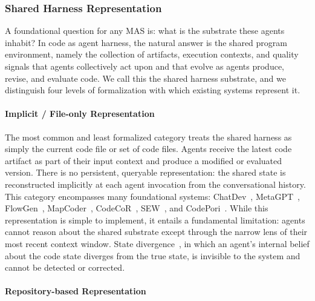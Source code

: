 \subsubsection{Shared Harness Representation}

A foundational question for any MAS is: what is the substrate
these agents inhabit? In code as agent harness, the natural
answer is the shared program environment, namely the collection
of artifacts, execution contexts, and quality signals that agents
collectively act upon and that evolve as agents produce, revise,
and evaluate code. We call this the shared harness substrate, and
we distinguish four levels of formalization with which existing
systems represent it.

\paragraph{Implicit / File-only Representation}

The most common and least formalized category treats the shared
harness as simply the current code file or set of code files.
Agents receive the latest code artifact as part of their input
context and produce a modified or evaluated version. There is no
persistent, queryable representation: the shared state is
reconstructed implicitly at each agent invocation from the
conversational history. This category encompasses many
foundational systems: ChatDev~\cite{Qian2023ChatDev},
MetaGPT~\cite{Hong2023MetaGPT}, FlowGen~\cite{Lin2025Soen101},
MapCoder~\cite{islam2024mapcoder},
CodeCoR~\cite{Pan2025CodeCoR}, SEW~\cite{Liu2025SEW}, and
CodePori~\cite{Rasheed2024Codepori}. While this representation is
simple to implement, it entails a fundamental limitation: agents
cannot reason about the shared substrate except through the
narrow lens of their most recent context window.
State divergence~\cite{Guo2025SyncMind}, in which an agent's
internal belief about the code state diverges from the true
state, is invisible to the system and cannot be detected or
corrected.

\paragraph{Repository-based Representation}

